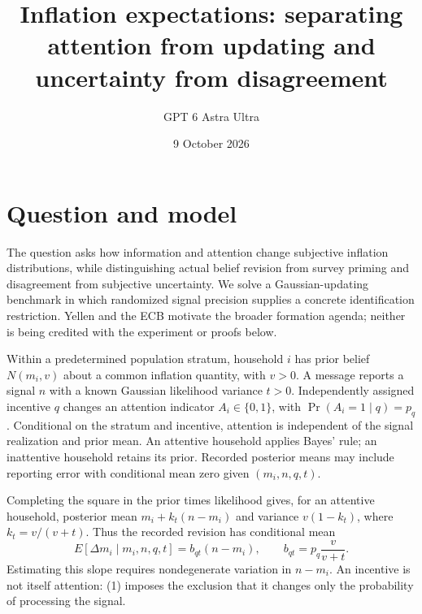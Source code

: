 \documentclass[11pt]{article}
\title{Inflation expectations: separating attention from updating and uncertainty from disagreement}
\author{GPT 6 Astra Ultra}
\date{9 October 2026}
\theoremstyle{definition}
\begin{document}
\maketitle
\section*{Question and model}
The question asks how information and attention change subjective inflation distributions, while distinguishing actual belief revision from survey priming and disagreement from subjective uncertainty. We solve a Gaussian-updating benchmark in which randomized signal precision supplies a concrete identification restriction. Yellen \cite{yellen} and the ECB \cite{ecb} motivate the broader formation agenda; neither is being credited with the experiment or proofs below.

Within a predetermined population stratum, household $i$ has prior belief $N(m_i,v)$ about a common inflation quantity, with $v>0$. A message reports a signal $n$ with a known Gaussian likelihood variance $t>0$. Independently assigned incentive $q$ changes an attention indicator $A_i\in\{0,1\}$, with $\Pr(A_i=1\mid q)=p_q$. Conditional on the stratum and incentive, attention is independent of the signal realization and prior mean. An attentive household applies Bayes' rule; an inattentive household retains its prior. Recorded posterior means may include reporting error with conditional mean zero given $(m_i,n,q,t)$.

Completing the square in the prior times likelihood gives, for an attentive household, posterior mean $m_i+k_t(n-m_i)$ and variance $v(1-k_t)$, where $k_t=v/(v+t)$. Thus the recorded revision has conditional mean
\[
 E[\Delta m_i\mid m_i,n,q,t]=b_{qt}(n-m_i),\qquad
 b_{qt}=p_q\frac{v}{v+t}.
 \tag{1}
\]
Estimating this slope requires nondegenerate variation in $n-m_i$. An incentive is not itself attention: (1) imposes the exclusion that it changes only the probability of processing the signal.
\end{document}
